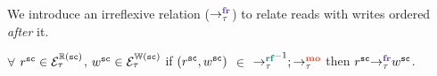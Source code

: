 
We introduce an irreflexive relation  ($\setFR$) to relate  
\sc reads with \sc writes ordered {\em after} it.

\begin{definition}\newline
	$\forall$ $r^\sc \in \ordreads{\sc}_\tau$, $w^\sc \in \ordwrites{\sc}_\tau$
	if $(r^\sc,w^\sc)$ $\in$ $\setRF^{-1};\setMO$ then $\fr{\tau}{r^\sc}{w^\sc}$.
\end{definition}

